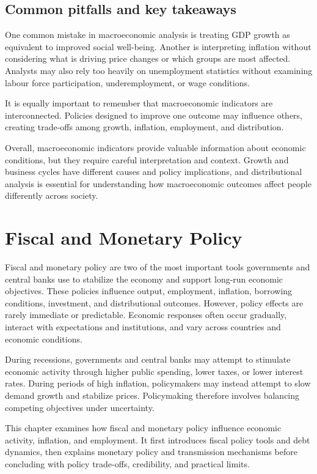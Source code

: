 \documentclass[
  11pt,
  oneside]{book}
\begin{document}
\section{Common pitfalls and key takeaways}\label{common-pitfalls-and-key-takeaways-1}

One common mistake in macroeconomic analysis is treating GDP growth as equivalent to improved social well-being. Another is interpreting inflation without considering what is driving price changes or which groups are most affected. Analysts may also rely too heavily on unemployment statistics without examining labour force participation, underemployment, or wage conditions.

It is equally important to remember that macroeconomic indicators are interconnected. Policies designed to improve one outcome may influence others, creating trade-offs among growth, inflation, employment, and distribution.

Overall, macroeconomic indicators provide valuable information about economic conditions, but they require careful interpretation and context. Growth and business cycles have different causes and policy implications, and distributional analysis is essential for understanding how macroeconomic outcomes affect people differently across society.

\chapter{Fiscal and Monetary Policy}\label{policy}

Fiscal and monetary policy are two of the most important tools governments and central banks use to stabilize the economy and support long-run economic objectives. These policies influence output, employment, inflation, borrowing conditions, investment, and distributional outcomes. However, policy effects are rarely immediate or predictable. Economic responses often occur gradually, interact with expectations and institutions, and vary across countries and economic conditions.

During recessions, governments and central banks may attempt to stimulate economic activity through higher public spending, lower taxes, or lower interest rates. During periods of high inflation, policymakers may instead attempt to slow demand growth and stabilize prices. Policymaking therefore involves balancing competing objectives under uncertainty.

This chapter examines how fiscal and monetary policy influence economic activity, inflation, and employment. It first introduces fiscal policy tools and debt dynamics, then explains monetary policy and transmission mechanisms before concluding with policy trade-offs, credibility, and practical limits.
\end{document}
